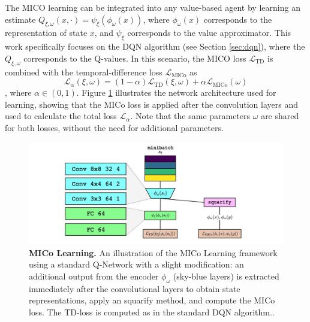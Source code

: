 The MICO learning can be integrated into any value-based agent by learning an estimate $Q_{\xi, \omega}(x, \cdot) = \psi_\xi(\phi_\omega(x))$, where $\phi_\omega(x)$ corresponds to the representation of state $x$, and $\psi_\xi$ corresponds to the value approximator. This work specifically focuses on the DQN algorithm (see Section \ref{sec:dqn}), where the $Q_{\xi, \omega}$ corresponds to the Q-values. In this scenario, the MICO loss $\mathcal{L}_{\text{TD}}$ is combined with the temporal-difference loss $\mathcal{L}_{\text{MICo}}$ as 
\begin{equation}
    \mathcal{L}_\alpha(\xi, \omega) = (1 - \alpha)\mathcal{L}_{\text{TD}}(\xi, \omega) + \alpha \mathcal{L}_{\text{MICo}}(\omega)
\end{equation}
, where $\alpha \in (0, 1)$. 
Figure \ref{fig:mico_learning} illustrates the network architecture used for learning, showing that the MICo loss is applied after the convolution layers and used to calculate the total loss $\mathcal{L}_\alpha$. Note that the same parameters $\omega$ are shared for both losses, without the need for additional parameters.

\begin{figure}[h]
    \centering
    \includegraphics[width=1\linewidth]{Figures/mico_learning.jpg}
    \caption[MICo Learning]{\textbf{MICo Learning.} An illustration of the MICo Learning framework using a standard Q-Network with a slight modification: an additional output from the encoder \(\phi_\omega\) (sky-blue layers) is extracted immediately after the convolutional layers to obtain state representations, apply an squarify method, and compute the MICo loss. The TD-loss is computed as in the standard DQN algorithm..}
    \label{fig:mico_learning}
\end{figure}

